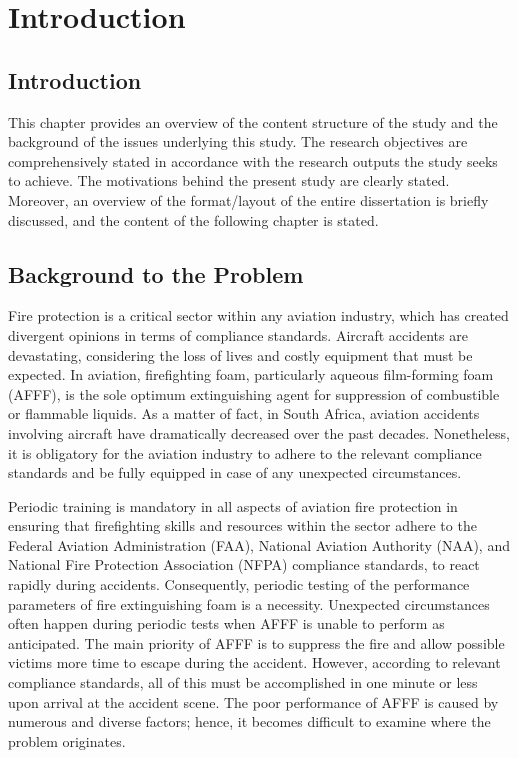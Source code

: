 \chapter{Introduction}
\section{Introduction}
This chapter provides an overview of the content structure of the study and the background of the issues underlying this study. The research objectives are comprehensively stated in accordance with the research outputs the study seeks to achieve. The motivations behind the present study are clearly stated. Moreover, an overview of the format/layout of the entire dissertation is briefly discussed, and the content of the following chapter is stated.

\section{Background to the Problem}
Fire protection is a critical sector within any aviation industry, which has created divergent opinions in terms of compliance standards. Aircraft accidents are devastating, considering the loss of lives and costly equipment that must be expected. In aviation, firefighting foam, particularly aqueous film-forming foam (AFFF), is the sole optimum extinguishing agent for suppression of combustible or flammable liquids. As a matter of fact, in South Africa, aviation accidents involving aircraft have dramatically decreased over the past decades. Nonetheless, it is obligatory for the aviation industry to adhere to the relevant compliance standards and be fully equipped in case of any unexpected circumstances.

Periodic training is mandatory in all aspects of aviation fire protection in ensuring that firefighting skills and resources within the sector adhere to the Federal Aviation Administration (FAA), National Aviation Authority (NAA), and National Fire Protection Association (NFPA) compliance standards, to react rapidly during accidents. Consequently, periodic testing of the performance parameters of fire extinguishing foam is a necessity. Unexpected circumstances often happen during periodic tests when AFFF is unable to perform as anticipated. The main priority of AFFF is to suppress the fire and allow possible victims more time to escape during the accident. However, according to relevant compliance standards, all of this must be accomplished in one minute or less upon arrival at the accident scene. The poor performance of AFFF is caused by numerous and diverse factors; hence, it becomes difficult to examine where the problem originates.


